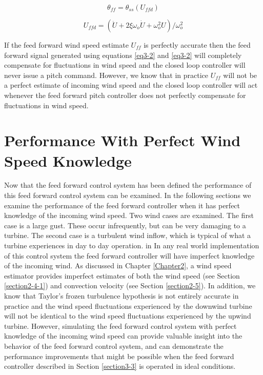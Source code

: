 \begin{equation}
	\theta_{ff} =  \theta_{ss}(U_{ffd}) \label{eq3-2}
\end{equation}

\begin{equation}
	U_{ffd} =  (\ddot{U} + 2 \xi \omega_o \dot{U} + \omega_o^2 U) / \omega_o^2 \label{eq3-3}
\end{equation}

If the feed forward wind speed estimate $U_{ff}$ is perfectly accurate then the feed forward signal generated using equations \ref{eq3-2} and \ref{eq3-2} will completely compensate for fluctuations in wind speed and the closed loop controller will never issue a pitch command. However, we know that in practice $U_{ff}$ will not be a perfect estimate of incoming wind speed and the closed loop controller will act whenever the feed forward pitch controller does not perfectly compensate for fluctuations in wind speed.

\section{Performance With Perfect Wind Speed Knowledge}

Now that the feed forward control system has been defined the performance of this feed forward control system can be examined. In the following sections we examine the performance of the feed forward controller when it has perfect knowledge of the incoming wind speed. Two wind cases are examined. The first case is a large gust. These occur infrequently, but can be very damaging to a turbine. The second case is a turbulent wind inflow, which is typical of what a turbine experiences in day to day operation. in In any real world implementation of this control system the feed forward controller will have imperfect knowledge of the incoming wind. As discussed in Chapter \ref{Chapter2}, a wind speed estimator provides imperfect estimates of both the wind speed (see Section  \ref{section2-4-1}) and convection velocity (see Section \ref{section2-5}). In addition, we know that Taylor's frozen turbulence hypothesis is not entirely accurate in practice and the wind speed fluctuations experienced by the downwind turbine will not be identical to the wind speed fluctuations experienced by the upwind turbine. However, simulating the feed forward control system with perfect knowledge of the incoming wind speed can provide valuable insight into the behavior of the feed forward control system, and can demonstrate the performance improvements that might be possible when the feed forward controller described in Section \ref{section3-3} is operated in ideal conditions. 




